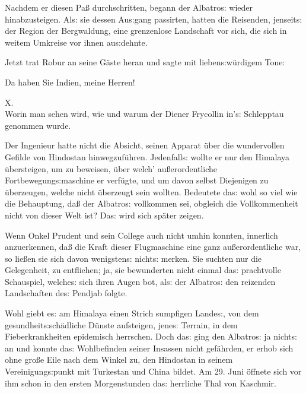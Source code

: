 \documentclass[oneside,12pt]{book}
\newenvironment{antiqua}{\normalfont}{}
\newcommand{\s}{s:}
\begin{document}
Nachdem er diesen Pa{\ss} durchschritten, begann der
{\glqq}Albatro{\s}{\grqq} wieder hinabzusteigen. Al{\s} sie dessen
Au{\s}gang passirten, hatten die Reisenden, jenseit{\s} der Region
der Bergwaldung, eine grenzenlose Landschaft vor sich, die sich in
weitem Umkreise vor ihnen au{\s}dehnte.

Jetzt trat Robur an seine G\"aste heran und sagte mit
lieben{\s}w\"urdigem Tone:

{\glqq}Da haben Sie Indien, meine Herren!{\grqq}



\newpage\begin{center}\label{kap10}
{\large \begin{antiqua}X.\end{antiqua}\\
Worin man sehen wird, wie und warum der Diener Frycollin in'{\s}
Schlepptau genommen wurde.\\\bigskip}
\end{center}



Der Ingenieur hatte nicht die Absicht, seinen Apparat \"uber die
wundervollen Gefilde von Hindostan hinwegzuf\"uhren. Jedenfall{\s}
wollte er nur den Himalaya \"ubersteigen, um zu beweisen, \"uber
welch' au{\ss}erordentliche Fortbewegung{\s}maschine er verf\"ugte,
und um davon selbst Diejenigen zu \"uberzeugen, welche nicht
\"uberzeugt sein wollten. Bedeutete da{\s} wohl so viel wie die
Behauptung, da{\ss} der {\glqq}Albatro{\s}{\grqq} vollkommen sei,
obgleich die Vollkommenheit nicht von dieser Welt ist? Da{\s} wird
sich sp\"ater zeigen.

Wenn Onkel Prudent und sein College auch nicht umhin konnten,
innerlich anzuerkennen, da{\ss} die Kraft dieser Flugmaschine eine
ganz au{\ss}erordentliche war, so lie{\ss}en sie sich davon
wenigsten{\s} nicht{\s} merken. Sie suchten nur die Gelegenheit, zu
entfliehen; ja, sie bewunderten nicht einmal da{\s} prachtvolle
Schauspiel, welche{\s} sich ihren Augen bot, al{\s} der
{\glqq}Albatro{\s}{\grqq} den reizenden Landschaften de{\s} Pendjab
folgte.

Wohl giebt e{\s} am Himalaya einen Strich sumpfigen Lande{\s}, von
dem gesundheit{\s}sch\"adliche D\"unste aufsteigen, jene{\s} Terrain,
in dem Fieberkrankheiten epidemisch herrschen. Doch da{\s} ging den
{\glqq}Albatro{\s}{\grqq} ja nicht{\s} an und konnte da{\s}
Wohlbefinden seiner Insassen nicht gef\"ahrden, er erhob sich ohne
gro{\ss}e Eile nach dem Winkel zu, den Hindostan in seinem
Vereinigung{\s}punkt mit Turkestan und China bildet. Am 29. Juni
\"offnete sich vor ihm schon in den ersten Morgenstunden da{\s}
herrliche Thal von Kaschmir.
\end{document}

